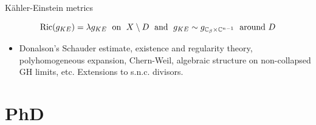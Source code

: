 \documentclass{beamer}
\newcommand{\C}{\mathbb{C}}
\begin{document}
\begin{frame}{K\"ahler-Einstein metrics}
\begin{center}
{
	}
\end{center}
\begin{equation*}
	\mbox{Ric}(g_{KE}) = \lambda g_{KE} \hspace{1mm} \mbox{ on } \hspace{1mm} X \setminus D \hspace{1mm} \mbox{ and } \hspace{1mm}  g_{KE} \sim g_{\C_{\beta} \times \C^{n-1}} \hspace{1mm} \mbox{ around }  D 
\end{equation*}	
\begin{itemize}
	\item Donalson's Schauder estimate, existence and regularity theory, polyhomogeneous expansion, Chern-Weil, algebraic structure on non-collapsed GH limits, etc. Extensions to s.n.c. divisors.
\end{itemize}
\end{frame}


\section{PhD}
\end{document}
